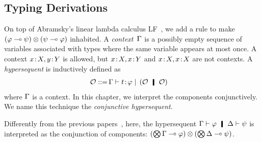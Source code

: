 \subsection{Typing Derivations}

On top of Abramsky's linear lambda calculus
LF~\citep{abramsky1993computational}, we add a rule to
make $(\varphi\multimap\psi)\otimes(\psi\multimap\varphi)$ inhabited. 
A \textit{context}~$\Gamma$ is a possibly empty sequence of
variables associated with
types where the same variable appears at most once.
A context ${x} \mathord{\colon\kern -2pt}{X}, {y} \mathord{\colon\kern -2pt}{Y}$ is allowed, but ${x} \mathord{\colon\kern -2pt}{X}, {x} \mathord{\colon\kern -2pt}{Y}$
and ${x} \mathord{\colon\kern -2pt}{X},{x} \mathord{\colon\kern -2pt}{X}$ are not contexts.
A \textit{hypersequent} is inductively defined as
\begin{align*}
 \hypert ::=\, &\G\tr\tj{t}{\phi}
 \mid\, (\hypert\hmid \hypert)
\end{align*}
where $\Gamma$ is a context.
In this chapter, we interpret the components conjunctively.
We name this technique the \textit{conjunctive
hypersequent}.

Differently from the previous
papers~\citep{avron91,Baaz01122003,avrontableau,avron96},
here, the hypersequent $\G\tr\phi\hmid \D\tr\psi$ is interpreted as the
conjunction of components:
$(\bigotimes\Gamma\multimap\varphi)\otimes (\bigotimes\Delta\multimap\psi)$.


